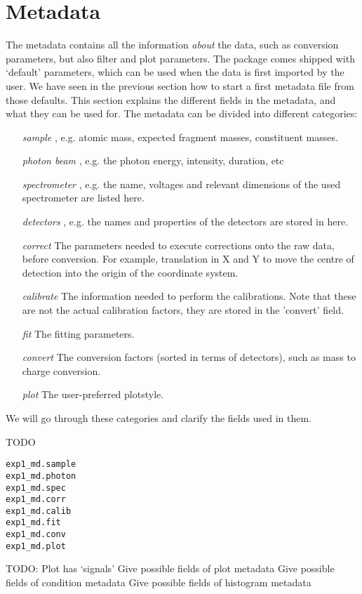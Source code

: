 \section{Metadata}
The metadata contains all the information \emph{about} the data, such as conversion parameters, but also filter and plot parameters. The package comes shipped with `default' parameters, which can be used when the data is first imported by the user. We have seen in the previous section how to start a first metadata file from those defaults. This section explains the different fields in the metadata, and what they can be used for. The metadata can be divided into different categories:

\begin{itemize}
\item[\emph{sample}], e.g. atomic mass, expected fragment masses, constituent masses.
\item[\emph{photon beam}], e.g. the photon energy, intensity, duration, etc
\item[\emph{spectrometer}],  e.g. the name, voltages and relevant dimensions of the used spectrometer are listed here.
\item[\emph{detectors}], e.g. the names and properties of the detectors are stored in here.
\item[\emph{correct}] The parameters needed to execute corrections onto the raw data, before conversion. For example, translation in X and Y to move the centre of detection into the origin of the coordinate system.
\item[\emph{calibrate}] The information needed to perform the calibrations. Note that these are not the actual calibration factors, they are stored in the 'convert' field.
\item[\emph{fit}] The fitting parameters.
\item[\emph{convert}] The conversion factors (sorted in terms of detectors), such as mass to charge conversion.
\item[\emph{plot}] The user-preferred plotstyle.
\end{itemize}

We will go through these categories and clarify the fields used in them.

TODO

\lstset{language=MATLAB}
\begin{lstlisting}
exp1_md.sample
exp1_md.photon
exp1_md.spec
exp1_md.corr
exp1_md.calib
exp1_md.fit
exp1_md.conv
exp1_md.plot
\end{lstlisting}

TODO:
Plot has `signals'
Give possible fields of plot metadata
Give possible fields of condition metadata
Give possible fields of histogram metadata
